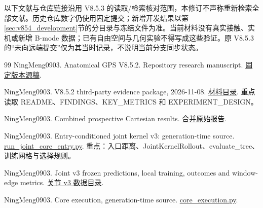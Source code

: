\documentclass[11pt,a4paper,fontset=fandol]{ctexart}
\theoremstyle{definition}
\theoremstyle{remark}\newtheorem{remark}[theorem]{说明}
\numberwithin{equation}{section}
\begin{document}
以下文献与仓库链接沿用 V8.5.3 的读取/检索核对范围，本修订不声称重新检索全部文献。历史仓库数字仍使用固定提交；新增开发结果以第\ref{sec:v854_development}节的分目录与冻结文件为准。当前材料没有真实接触、实机或新增 B-mode 数据；已有自由空间与几何实验不得写成这些验证。原 V8.5.3 的“未向远端提交”仅为其当时记录，不说明当前分支同步状态。

\begin{thebibliography}{99}
NingMeng0903. Anatomical GPS V8.5.2. Repository research manuscript.
\href{https://github.com/NingMeng0903/RealUS_playground/blob/190e9e3cec96f2a467884b545e465364cfc76501/NMI_idea/ideas/Anatomical_GPS_V8.5.2.tex}{固定版本源稿}.

NingMeng0903. V8.5.2 third-party evidence package, 2026-11-08.
\href{https://github.com/NingMeng0903/RealUS_playground/tree/190e9e3cec96f2a467884b545e465364cfc76501/NMI_idea/experiments/v852/2026-11-08/third_party_review}{材料目录}.
重点读取 README、FINDINGS、KEY\_METRICS 和 EXPERIMENT\_DESIGN。

NingMeng0903. Combined prospective Cartesian results.
\href{https://github.com/NingMeng0903/RealUS_playground/blob/190e9e3cec96f2a467884b545e465364cfc76501/NMI_idea/experiments/v852/2026-11-08/third_party_review/reports/combined/RESULTS.txt}{合并原始报告}.

NingMeng0903. Entry-conditioned joint kernel v3: generation-time source.
\href{https://github.com/NingMeng0903/RealUS_playground/blob/190e9e3cec96f2a467884b545e465364cfc76501/NMI_idea/experiments/v852/2026-11-08/third_party_review/data/v852_joint_core_20261108/entry_conditioned_v3/source_snapshot/run_joint_core_entry.py}{run\_joint\_core\_entry.py}.
重点：入口距离、JointKernelRollout、evaluate\_tree、训练网格与选择规则。

NingMeng0903. Joint v3 frozen predictions, local training, outcomes and window-edge metrics.
\href{https://github.com/NingMeng0903/RealUS_playground/tree/190e9e3cec96f2a467884b545e465364cfc76501/NMI_idea/experiments/v852/2026-11-08/third_party_review/data/v852_joint_core_20261108/entry_conditioned_v3}{关节 v3 数据目录}.

NingMeng0903. Core execution, generation-time source.
\href{https://github.com/NingMeng0903/RealUS_playground/blob/190e9e3cec96f2a467884b545e465364cfc76501/NMI_idea/experiments/v852/2026-11-08/third_party_review/data/v852_core_suite_20261108/source_snapshot/core_execution.py}{core\_execution.py}.


\end{thebibliography}
\end{document}
